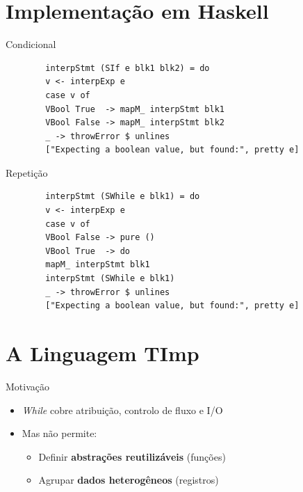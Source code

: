 \section{Implementação em
Haskell}\label{implementauxe7uxe3o-em-haskell}

\begin{frame}[fragile]{Condicional}

    \begin{lstlisting}
        interpStmt (SIf e blk1 blk2) = do
        v <- interpExp e
        case v of
        VBool True  -> mapM_ interpStmt blk1
        VBool False -> mapM_ interpStmt blk2
        _ -> throwError $ unlines
        ["Expecting a boolean value, but found:", pretty e]
    \end{lstlisting}
\end{frame}

\begin{frame}[fragile]{Repetição}

    \begin{lstlisting}
        interpStmt (SWhile e blk1) = do
        v <- interpExp e
        case v of
        VBool False -> pure ()
        VBool True  -> do
        mapM_ interpStmt blk1
        interpStmt (SWhile e blk1)
        _ -> throwError $ unlines
        ["Expecting a boolean value, but found:", pretty e]
    \end{lstlisting}
\end{frame}


\section{A Linguagem TImp}\label{a-linguagem-timp}

\begin{frame}{Motivação}

    \begin{itemize}

        \item
        \emph{While} cobre atribuição, controlo de fluxo e I/O
        \item
        Mas não permite:

        \begin{itemize}

            \item
            Definir \textbf{abstrações reutilizáveis} (funções)
            \item
            Agrupar \textbf{dados heterogêneos} (registros)
        \end{itemize}
    \end{itemize}
\end{frame}

